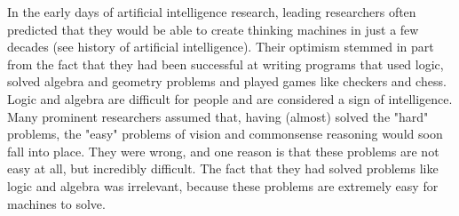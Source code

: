 \documentclass{article}
\begin{document}
In the early days of artificial intelligence research, leading researchers often predicted that they would be able to create thinking machines in just a few decades (see history of artificial intelligence). Their optimism stemmed in part from the fact that they had been successful at writing programs that used logic, solved algebra and geometry problems and played games like checkers and chess. Logic and algebra are difficult for people and are considered a sign of intelligence. Many prominent researchers assumed that, having (almost) solved the "hard" problems, the "easy" problems of vision and commonsense reasoning would soon fall into place. They were wrong, and one reason is that these problems are not easy at all, but incredibly difficult. The fact that they had solved problems like logic and algebra was irrelevant, because these problems are extremely easy for machines to solve.
\end{document}
